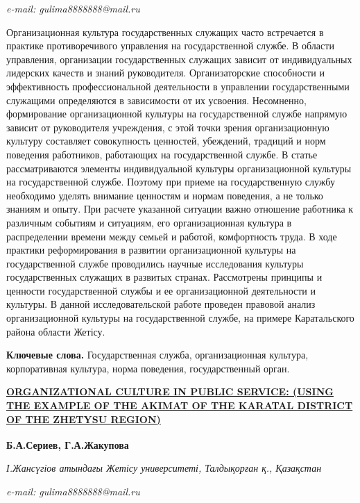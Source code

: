 \emph{e-mail: gulima8888888@mail.ru}

Организационная культура государственных служащих часто встречается в
практике противоречивого управления на государственной службе. В области
управления, организации государственных служащих зависит от
индивидуальных лидерских качеств и знаний руководителя. Организаторские
способности и эффективность профессиональной деятельности в управлении
государственными служащими определяются в зависимости от их усвоения.
Несомненно, формирование организационной культуры на государственной
службе напрямую зависит от руководителя учреждения, с этой точки зрения
организационную культуру составляет совокупность ценностей, убеждений,
традиций и норм поведения работников, работающих на государственной
службе. В статье рассматриваются элементы индивидуальной культуры
организационной культуры на государственной службе. Поэтому при приеме
на государственную службу необходимо уделять внимание ценностям и нормам
поведения, а не только знаниям и опыту. При расчете указанной ситуации
важно отношение работника к различным событиям и ситуациям, его
организационная культура в распределении времени между семьей и работой,
комфортность труда. В ходе практики реформирования в развитии
организационной культуры на государственной службе проводились научные
исследования культуры государственных служащих в развитых странах.
Рассмотрены принципы и ценности государственной службы и ее
организационной деятельности и культуры. В данной исследовательской
работе проведен правовой анализ организационной культуры на
государственной службе, на примере Каратальского района области Жетісу.

{\bfseries Ключевые слова.} Государственная служба, организационная
культура, корпоративная культура, норма поведения, государственный
орган.

\href{https://zhetysu.edu.kz/\%D1\%81\%D0\%B5\%D1\%80\%D0\%B8\%D0\%B5\%D0\%B2-\%D0\%B1\%D0\%BE\%D0\%BB\%D0\%B0\%D1\%82-\%D0\%B0\%D0\%B1\%D0\%B4\%D1\%83\%D0\%BB\%D0\%B4\%D0\%B0\%D2\%B1\%D0\%BB\%D1\%8B/}{{\bfseries ORGANIZATIONAL
CULTURE IN PUBLIC SERVICE: (USING THE EXAMPLE OF THE AKIMAT OF THE
KARATAL DISTRICT OF THE ZHETYSU REGION)}}

{\bfseries Б.А.Сериев, Г.А.Жакупова\textsuperscript{\envelope }}

\emph{І.Жансүгіов атындағы Жетісу университеті, Талдықорған қ.,
Қазақстан}

\emph{e-mail: gulima8888888@mail.ru}

